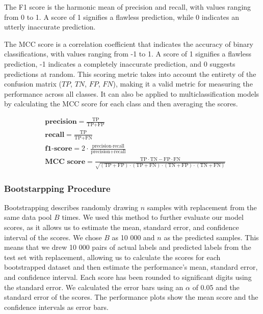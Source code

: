 \documentclass{bioinfo}
\begin{document}
\begin{methods}
The F1 score is the harmonic mean of precision and recall, with values ranging from 0 to 1.
A score of 1 signifies a flawless prediction, while 0 indicates an utterly inaccurate prediction.

The MCC score is a correlation coefficient that indicates the accuracy of binary classifications, with values ranging from -1 to 1. 
A score of 1 signifies a flawless prediction, -1 indicates a completely inaccurate prediction, and 0 suggests predictions at random.
This scoring metric takes into account the entirety of the confusion matrix ($TP$, $TN$, $FP$, $FN$), making it a valid
metric for measuring the performance across all classes.
It can also be applied to multiclassification models by calculating the MCC score for each class and then averaging the scores.

\begin{align}
	&\textbf{precision} = \frac{\text{TP}}{\text{TP} + \text{FP}} \\
    &\textbf{recall} = \frac{\text{TP}}{\text{TP} + \text{FN}} \\
    &\textbf{f1-score} = 2 \cdot \frac{\text{precision} \cdot \text{recall}}{\text{precision} + \text{recall}} \\
    &\textbf{MCC score} = \frac{\text{TP} \cdot \text{TN} - \text{FP} \cdot \text{FN}}{\sqrt{(\text{TP} + \text{FP}) \cdot (\text{TP} + \text{FN}) \cdot (\text{TN} + \text{FP}) \cdot (\text{TN} + \text{FN})}}
\end{align}

\subsubsection{Bootstarpping Procedure}
Bootstrapping describes randomly drawing $n$ samples with replacement from the same data pool $B$ times.
We used this method to further evaluate our model scores, as it allows us to estimate the mean, standard error, and confidence interval of the scores.
We chose $B$ as 10 000 and $n$ as the predicted samples.
This means that we drew 10 000 pairs of actual labels and predicted labels from the test set with replacement,
allowing us to calculate the scores for each bootstrapped dataset and then estimate the performance's mean, 
standard error, and confidence interval.
Each score has been rounded to significant digits using the standard error.
We calculated the error bars using an $\alpha$ of 0.05 and the standard error of the scores.
The performance plots show the mean score and the confidence intervals as error bars.

\end{methods}
\end{document}
